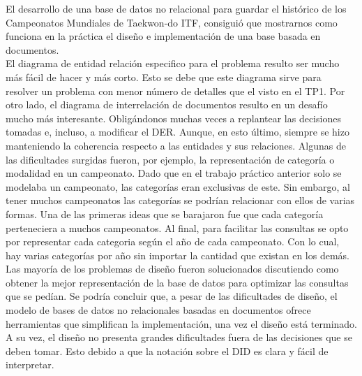 El desarrollo de una base de datos no relacional para guardar el histórico de los Campeonatos Mundiales de
Taekwon-do ITF, consiguió que mostrarnos como funciona en la práctica el diseño e implementación de una base basada en
documentos.\\

El diagrama de entidad relación especifico para el problema resulto ser mucho más fácil de hacer y más corto.
Esto se debe que este diagrama sirve para resolver un problema con menor número de detalles que el visto en el TP1.
Por otro lado, el diagrama de interrelación de documentos resulto en un desafío mucho más interesante. Obligándonos
muchas veces a replantear las decisiones tomadas e, incluso, a modificar el DER. Aunque, en esto último, siempre se hizo
manteniendo la coherencia respecto a las entidades y sus relaciones. Algunas de las dificultades surgidas fueron, por ejemplo,
la representación de categoría o modalidad en un campeonato. Dado que en el trabajo práctico anterior solo se modelaba un
campeonato, las categorías eran exclusivas de este. Sin embargo, al tener muchos campeonatos las categorías se podrían
relacionar con ellos de varias formas. Una de las primeras ideas que se barajaron fue que cada categoría perteneciera a
muchos campeonatos. Al final, para facilitar las consultas se opto por representar cada categoria según el año de cada
campeonato. Con lo cual, hay varias categorías por año sin importar la cantidad que existan en los demás. Las mayoría
de los problemas de diseño fueron solucionados discutiendo como obtener la mejor representación de la base de datos
para optimizar las consultas que se pedían. Se podría concluir que, a pesar de las dificultades de diseño, el modelo de
bases de datos no relacionales basadas en documentos ofrece herramientas que simplifican la implementación, una vez el
diseño está terminado. A su vez, el diseño no presenta grandes dificultades fuera de las decisiones que se deben tomar.
Esto debido a que la notación sobre el DID es clara y fácil de interpretar.
